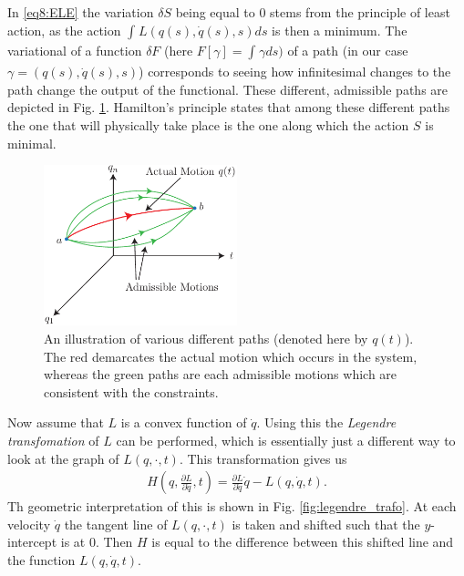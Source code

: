 \begin{ex}
\begin{remark}[]
	In \eqref{eq8:ELE} the variation $\delta S$ being equal to 0 stems from the principle of least action, as the action $\int_{}^{} L(q(s), \dot{q}(s), s)ds$ is then a minimum. The variational of a function $\delta F$ (here $F[\gamma]=\int_{}^{} \gamma ds)$ of a path (in our case $\gamma = (q(s), \dot{q}(s), s)$) corresponds to seeing how infinitesimal changes to the path change the output of the functional. These different, admissible paths are depicted in Fig. \ref{fig:variational_deriv}. Hamilton's principle states that among these different paths the one that will physically take place is the one along which the action $S$ is minimal.
	\begin{figure}[h!]
		\centering
		\includegraphics[width=0.5\textwidth]{figures/ch8/1variational_deriv.pdf}
		\caption{An illustration of various different paths (denoted here by $q(t)$). The red demarcates the actual motion which occurs in the system, whereas the green paths are each admissible motions which are consistent with the constraints.}
		\label{fig:variational_deriv}
	\end{figure}
\end{remark}
Now assume that $L$ is a convex function of $\dot{q}$. Using this the \emph{Legendre transfomation} of $L$ can be performed, which is essentially just a different way to look at the graph of $L(q, \cdot, t)$. This transformation gives us
\begin{align}
	\boxed{H\left(q, \frac{\partial L}{\partial \dot{q}}, t\right) = \frac{\partial L}{\partial \dot{q}}\dot{q} - L(q, \dot{q}, t).} \label{eq8:hamiltonian_def}
\end{align}
Th geometric interpretation of this is shown in Fig. \ref{fig:legendre_trafo}. At each velocity $\dot{q}$ the tangent line of $L(q, \cdot, t)$ is taken and shifted such that the $y$-intercept is at $0$. Then $H$ is equal to the difference between this shifted line and the function $L(q, \dot{q}, t)$.
\begin{figure}[h!]

\end{figure}
\end{ex}

